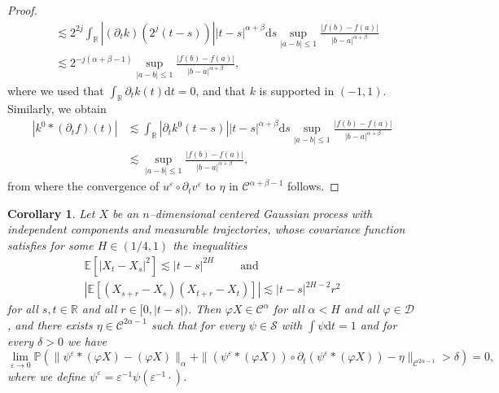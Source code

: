 \documentclass[a4paper,11pt]{article}
\newcommand{\cdummy}{\cdot}
\newcommand{\mathd}{\mathrm{d}}
\newcommand{\tmop}[1]{\ensuremath{\operatorname{#1}}}
\newtheorem{corollary}[theorem]{Corollary}
\theoremstyle{remark}
\newcommand{\CC}{\ensuremath{\mathscr{C}}}
\newcommand{\CD}{\ensuremath{\mathscr{D}}}
\newcommand{\CS}{\ensuremath{\mathscr{S}}}
\newcommand{\reso}{\,\mathord{\circ}\,}
\begin{document}
\begin{proof}
\begin{align*}
     & \lesssim 2^{2j} \int_{\mathbb{R}} | ( \partial_{t} k ) ( 2^{j} ( t-s ) ) |   | t-s |^{\alpha + \beta} \mathd s \sup_{| a-b | \leqslant 1} \frac{| f( b ) -f ( a ) |}{| b-a |^{\alpha + \beta}}\\
     & \lesssim 2^{-j ( \alpha + \beta -1 )} \sup_{| a-b | \leqslant 1} \frac{| f ( b ) -f ( a ) |}{| b-a |^{\alpha + \beta}},
  \end{align*}
  where we used that $\int_{\mathbb{R}} \partial_{t} k ( t ) \mathd t=0$,
  and that $k$ is supported in $( -1,1)$. Similarly, we obtain
  \begin{align*}
     | k^{0} \ast ( \partial_{t} f ) ( t ) | & \lesssim \int_{\mathbb{R}} | \partial_{t} k^{0} ( t-s ) |   | t-s |^{\alpha + \beta} \mathd s \sup_{| a-b | \leqslant 1} \frac{| f ( b ) -f ( a ) |}{| b-a |^{\alpha + \beta}} \\
     & \lesssim \sup_{| a-b | \leqslant 1} \frac{| f ( b ) -f ( a ) |}{| b-a |^{\alpha + \beta}},
  \end{align*}
  from where the convergence of $u^{\varepsilon} \reso \partial_{t} v^{\varepsilon}$ to $\eta$ in $\CC^{\alpha + \beta -1}$ follows.
\end{proof}

\begin{corollary}\label{corollary:existence of rough path area}
  Let $X$ be an $n$--dimensional centered Gaussian process with independent components and measurable trajectories, whose covariance function satisfies for some $H \in ( 1/4,1 )$ the inequalities
  \begin{gather}\label{eq:classical rough path covariance} \nonumber
     \mathbb{E} [ | X_{t} -X_{s} |^{2} ] \lesssim | t-s |^{2H} \hspace{2em} \tmop{and} \\
     | \mathbb{E} [ ( X_{s+r} -X_{s} ) ( X_{t+r} -X_{t} ) ] | \lesssim | t-s |^{2H-2}  r^{2}
  \end{gather}
  for all $s,t \in \mathbb{R}$ and all $r \in [ 0, | t-s | )$. Then $\varphi X \in \CC^{\alpha}$ for all $\alpha <H$ and all $\varphi \in \CD$, and there
  exists $\eta \in \CC^{2 \alpha -1}$ such that for every $\psi \in \CS$ with
  $\int \psi \mathd t=1$ and for every $\delta >0$ we have
  \[
     \lim_{\varepsilon \rightarrow 0} \mathbb{P} \left( \| \psi^{\varepsilon}  \ast ( \varphi X ) - ( \varphi X ) \|_{\alpha} + \| ( \psi^{\varepsilon}  \ast ( \varphi X ) ) \reso \partial_{t} ( \psi^{\varepsilon} \ast (\varphi X ) ) - \eta \|_{\CC^{2 \alpha -1}} > \delta \right) =0,
  \]
  where we define $\psi^{\varepsilon} = \varepsilon^{-1} \psi (\varepsilon^{-1} \cdummy )$.
\end{corollary}
\end{document}

